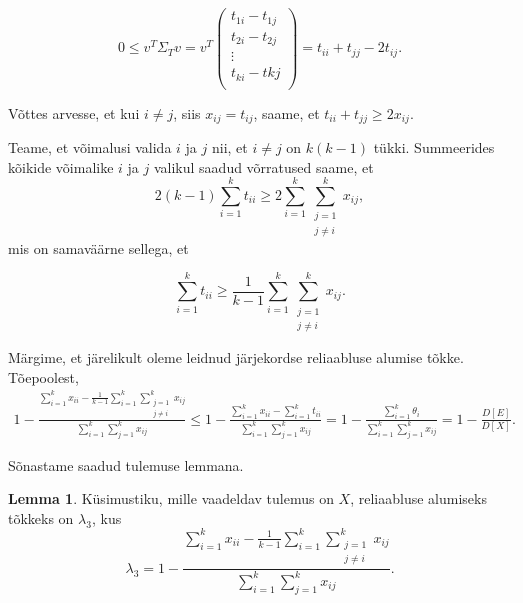 \documentclass[a4paper,12pt,oneside]{article}
\newcounter{lemma}[section]
\numberwithin{equation}{section}
\theoremstyle{definition}
\newtheorem{lambda_3}[lemma]{Lemma}
\begin{document}
\begin{equation*}
\label{eq:psd 1 -1 vector}
0 \leq v^T \Sigma_T v = v^T 
\begin{pmatrix}
t_{1i} - t_{1j} \\
t_{2i} - t_{2j} \\
\vdots \\
t_{ki} - t{kj} \\
\end{pmatrix}
= t_{ii} + t_{jj} - 2 t_{ij} \text{.}
\end{equation*}

Võttes arvesse, et kui $i \neq j$, siis $x_{ij} = t_{ij}$, saame, et $t_{ii} + t_{jj} \geq 2 x_{ij}$. 

Teame, et võimalusi valida $i$ ja $j$ nii, et $i \neq j$ on $k \left( k -1 \right)$ tükki. Summeerides kõikide võimalike $i$ ja $j$ valikul saadud võrratused saame, et
\begin{equation*}
2 \left( k - 1 \right) \sum \limits_{i=1}^k t_{ii} \geq 2  \sum \limits_{i=1}^k   \sum \limits_{\substack{j=1 \\ j \neq i}}^{k} x_{ij},
\end{equation*}
mis on samaväärne sellega, et

\begin{equation*}
\sum \limits_{i=1}^k t_{ii}  \geq  \frac{1}{k - 1} \sum \limits_{i=1}^k   \sum \limits_{\substack{j=1 \\ j \neq i}}^{k} x_{ij}.
\end{equation*}


Märgime, et järelikult oleme leidnud järjekordse reliaabluse alumise tõkke. Tõe\-poolest,    
\begin{gather*}
 1 - \frac{\sum \limits_{i=1}^k x_{ii} -  \frac{1}{k - 1} \sum \limits_{i=1}^k   \sum \limits_{\substack{j=1 \\ j \neq i}}^{k} x_{ij}}{\sum \limits_{i=1}^k \sum \limits_{j=1}^k x_{ij}} 
\leq 1 - \frac{\sum \limits_{i=1}^k x_{ii} - \sum \limits_{i=1}^k  t_{ii}}{\sum \limits_{i=1}^k \sum \limits_{j=1}^k x_{ij}} =   1 - \frac{\sum \limits_{i=1}^k \theta_i}{\sum \limits_{i=1}^k \sum \limits_{j=1}^k x_{ij}} =  1 - \frac{D \left[ E \right]}{D \left[ X \right]} \text{.}
\end{gather*}

Sõnastame saadud tulemuse lemmana.

\vspace{10pt}

\begin{lambda_3}
Küsimustiku, mille vaadeldav tulemus on $X$, reliaabluse alumiseks tõkkeks on $\lambda_3$, kus 
\begin{equation*}
\lambda_3 = 1 - \frac{\sum \limits_{i=1}^k x_{ii} -  \frac{1}{k - 1} \sum \limits_{i=1}^k   \sum \limits_{\substack{j=1 \\ j \neq i}}^{k} x_{ij}}{\sum \limits_{i=1}^k \sum \limits_{j=1}^k x_{ij}} \text{.}
\end{equation*}
\end{lambda_3}
\end{document}
